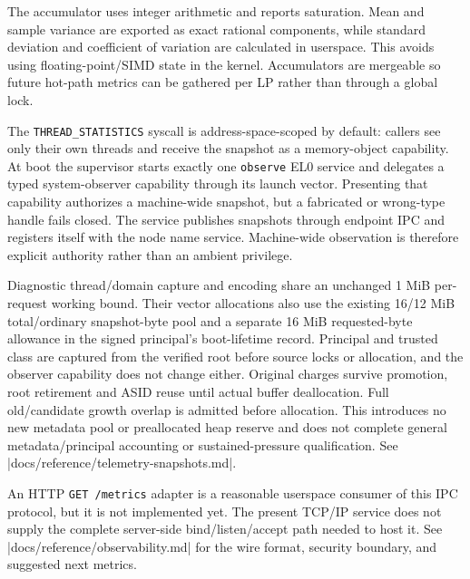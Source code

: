 The accumulator uses integer arithmetic and reports saturation. Mean and sample
variance are exported as exact rational components, while standard deviation and
coefficient of variation are calculated in userspace. This avoids using
floating-point/SIMD state in the kernel. Accumulators are mergeable so future
hot-path metrics can be gathered per LP rather than through a global lock.

The \texttt{THREAD\_STATISTICS} syscall is address-space-scoped by default:
callers see only their own threads and receive the snapshot as a memory-object
capability. At boot the supervisor starts exactly one \texttt{observe} EL0
service and delegates a typed system-observer capability through its launch
vector. Presenting that capability authorizes a machine-wide snapshot, but a
fabricated or wrong-type handle fails closed. The service publishes snapshots
through endpoint IPC and registers itself with the node name service.
Machine-wide observation is therefore explicit authority rather than an
ambient privilege.

Diagnostic thread/domain capture and encoding share an unchanged 1 MiB
per-request working bound. Their vector allocations also use the existing
16/12 MiB total/ordinary snapshot-byte pool and a separate 16 MiB requested-byte
allowance in the signed principal's boot-lifetime record. Principal and trusted
class are captured from the verified root before source locks or allocation, and
the observer capability does not change either. Original charges survive
promotion, root retirement and ASID reuse until actual buffer deallocation.
Full old/candidate growth overlap is admitted before allocation. This introduces
no new metadata pool or preallocated heap reserve and does not complete general
metadata/principal accounting or sustained-pressure qualification. See
\repofile|docs/reference/telemetry-snapshots.md|.

An HTTP \texttt{GET /metrics} adapter is a reasonable userspace consumer of
this IPC protocol, but it is not implemented yet. The present TCP/IP service
does not supply the complete server-side bind/listen/accept path needed to host
it. See \repofile|docs/reference/observability.md| for the wire format, security boundary,
and suggested next metrics.

\endinput

